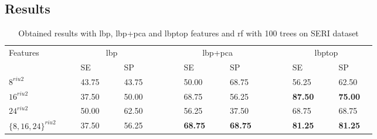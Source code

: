 
\subsection{Results}


\begin{table}
\caption{Obtained results with \ac{lbp}, \ac{lbp}+\ac{pca} and \ac{lbptop} features and \ac{rf} with 100 trees on SERI dataset}
\centering
\begin{tabular}{lcclcclcccclcclcccclcclc}
\toprule
Features 	& & &\multicolumn{4}{c}{\ac{lbp}}&	 & & & &\multicolumn{4}{c}{\ac{lbp}+\ac{pca}}& & & & &\multicolumn{4}{c}{\ac{lbptop}} &\\
  \cmidrule(l){2-8}  \cmidrule(l){10-16}  \cmidrule(l){18-24}
	       & & & SE & & & SP & & & & & SE & & & SP & & & & & SE & & & SP & \\
\midrule
 $8^{riu2}$ 						& & & 43.75 & & & 43.75 & & & & & 50.00 & & & 68.75 & & & & & 56.25 & & & 62.50 & \\	
 $16^{riu2}$						& & & 37.50 & & & 50.00 & & & & & 68.75 & & & 56.25 & & & & & \textbf{87.50} & & & \textbf{75.00} & \\	
 $24^{riu2}$						& & & 50.00 & & & 62.50 & & & & & 56.25 & & & 37.50 & & & & & 68.75 & & & 68.75 & \\
 $\lbrace 8,16,24\rbrace^{riu2}$	& & & 37.50 & & & 56.25 & & & & & \textbf{68.75} & & & \textbf{68.75} & & & & & \textbf{81.25} & & & \textbf{81.25} & \\
\bottomrule
\end{tabular}
\label{tab:LbPTopVolumeResult}
\end{table}



